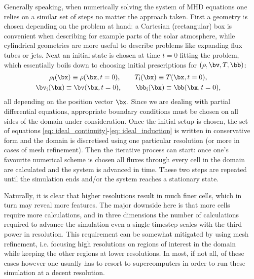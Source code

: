Generally speaking, when numerically solving the system of \gls{MHD} equations one relies on a similar set of steps no matter the approach taken. First a geometry is chosen depending on the problem at hand: a Cartesian (rectangular) box is convenient when describing for example parts of the solar atmosphere, while cylindrical geometries are more useful to describe problems like expanding flux tubes or jets. Next an initial state is chosen at time $t = 0$ fitting the problem, which essentially boils down to choosing initial prescriptions for $(\rho, \bv, T, \bb)$:
\begin{equation}
  \begin{gathered}
    \rho_\text{i}(\bx) \equiv \rho(\bx, t=0), \qquad T_\text{i}(\bx) \equiv T(\bx, t=0), \\
    \bv_\text{i}(\bx) \equiv \bv(\bx, t=0), \qquad \bb_\text{i}(\bx) \equiv \bb(\bx, t=0),
  \end{gathered}
\end{equation}
all depending on the position vector $\bx$. Since we are dealing with partial differential equations, appropriate boundary conditions must be chosen on all sides of the domain under consideration. Once the initial setup is chosen, the set of equations \eqref{eq: ideal_continuity}-\eqref{eq: ideal_induction} is written in conservative form and the domain is discretised using one particular resolution (or more in cases of mesh refinement). Then the iterative process can start: once one's favourite numerical scheme is chosen all fluxes through every cell in the domain are calculated and the system is advanced in time. These two steps are repeated until the simulation ends and/or the system reaches a stationary state.

Naturally, it is clear that higher resolutions result in much finer cells, which in turn may reveal more features. The major downside here is that more cells require more calculations, and in three dimensions the number of calculations required to advance the simulation even a single timestep scales with the third power in resolution. This requirement can be somewhat mitigated by using mesh refinement, i.e. focusing high resolutions on regions of interest in the domain while keeping the other regions at lower resolutions. In most, if not all, of these cases however one usually has to resort to supercomputers in order to run these simulation at a decent resolution.



